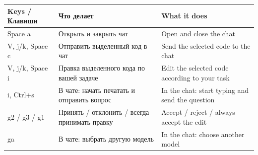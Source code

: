 \documentclass[10pt]{article}
\newcommand{\hdr}[3]{\toprule \textbf{#1} & \textbf{#2} & \textbf{#3} \\ \midrule \endhead}
\begin{document}
\begin{longtable}{@{}K A B@{}}
\hdr{Keys / Клавиши}{Что делает}{What it does}
Space a & Открыть и закрыть чат & Open and close the chat \\
V, j/k, Space c & Отправить выделенный код в чат & Send the selected code to the chat \\
V, j/k, Space i & Правка выделенного кода по вашей задаче & Edit the selected code according to your task \\
i, Ctrl+s & В чате: начать печатать и отправить вопрос & In the chat: start typing and send the question \\
g2 / g3 / g1 & Принять / отклонить / всегда принимать правку & Accept / reject / always accept the edit \\
ga & В чате: выбрать другую модель & In the chat: choose another model \\
\end{longtable}
\end{document}
